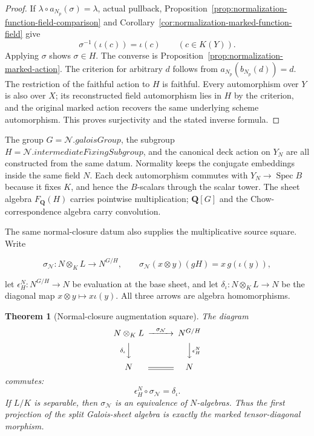 \documentclass[11pt]{article}
\newtheorem{theorem}{Theorem}[section]
\theoremstyle{definition}
\theoremstyle{remark}
\DeclareMathOperator{\Spec}{Spec}
\newcommand{\Q}{\mathbf Q}
\begin{document}
\begin{proof}
If \(\lambda\circ a_{N_p}(\sigma)=\lambda\), actual pullback,
Proposition~\ref{prop:normalization-function-field-comparison} and
Corollary~\ref{cor:normalization-marked-function-field} give
\[
 \sigma^{-1}(\iota(c))=\iota(c)\qquad(c\in K(Y)).
\]
Applying \(\sigma\) shows \(\sigma\in H\). The converse is
Proposition~\ref{prop:normalization-marked-action}. The criterion for
arbitrary \(d\) follows from \(a_{N_p}(b_{N_p}(d))=d\).
The restriction of the faithful action to \(H\) is faithful.
Every automorphism over \(Y\) is also over \(X\); its reconstructed
field automorphism lies in \(H\) by the criterion, and the original
marked action recovers the same underlying scheme automorphism.
This proves surjectivity and the stated inverse formula.
\end{proof}

The group \(G=\mathcal N.\mathit{galoisGroup}\), the subgroup
\(H=\mathcal N.\mathit{intermediateFixingSubgroup}\), and the canonical deck
action on \(Y_N\) are all constructed from the same datum.  Normality keeps the conjugate embeddings inside the same field \(N\).
Each deck automorphism commutes with \(Y_N\to\Spec B\) because it fixes
\(K\), and hence the \(B\)-scalars through the scalar tower. The sheet
algebra \(F_{\Q}(H)\) carries pointwise multiplication; \(\Q[G]\) and
the Chow-correspondence algebra carry convolution.

The same normal-closure datum also supplies the multiplicative source square.
Write

\[
  \sigma_{\mathcal N}:N\otimes_KL\longrightarrow N^{G/H},
  \qquad
  \sigma_{\mathcal N}(x\otimes y)(gH)=x\,g(\iota(y)),
\]

let \(\epsilon_H^N:N^{G/H}\to N\) be evaluation at the base sheet, and let
\(\delta_\iota:N\otimes_KL\to N\) be the diagonal map
\(x\otimes y\mapsto x\iota(y)\).  All three arrows are algebra
homomorphisms.

\begin{theorem}[Normal-closure augmentation square]
\label{thm:normal-closure-augmentation}
The diagram
\[
\begin{CD}
N\otimes_KL @>{\sigma_{\mathcal N}}>> N^{G/H}\\
@V{\delta_\iota}VV @VV{\epsilon_H^N}V\\
N @= N
\end{CD}
\]
commutes:
\[
  \epsilon_H^N\circ\sigma_{\mathcal N}=\delta_\iota.
\]
If \(L/K\) is separable, then \(\sigma_{\mathcal N}\) is an equivalence of
\(N\)-algebras.  Thus the first projection of the split Galois-sheet algebra
is exactly the marked tensor-diagonal morphism.
\end{theorem}
\end{document}
